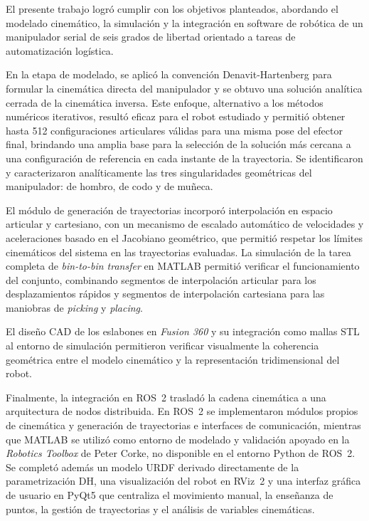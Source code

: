 \documentclass{article}
\begin{document}
El presente trabajo logró cumplir con los objetivos planteados, abordando el modelado cinemático, la simulación y la integración en software de robótica de un manipulador serial de seis grados de libertad orientado a tareas de automatización logística.

En la etapa de modelado, se aplicó la convención Denavit-Hartenberg para formular la cinemática directa del manipulador y se obtuvo una solución analítica cerrada de la cinemática inversa. Este enfoque, alternativo a los métodos numéricos iterativos, resultó eficaz para el robot estudiado y permitió obtener hasta 512 configuraciones articulares válidas para una misma pose del efector final, brindando una amplia base para la selección de la solución más cercana a una configuración de referencia en cada instante de la trayectoria. Se identificaron y caracterizaron analíticamente las tres singularidades geométricas del manipulador: de hombro, de codo y de muñeca.

El módulo de generación de trayectorias incorporó interpolación en espacio articular y cartesiano, con un mecanismo de escalado automático de velocidades y aceleraciones basado en el Jacobiano geométrico, que permitió respetar los límites cinemáticos del sistema en las trayectorias evaluadas. La simulación de la tarea completa de \textit{bin-to-bin transfer} en MATLAB permitió verificar el funcionamiento del conjunto, combinando segmentos de interpolación articular para los desplazamientos rápidos y segmentos de interpolación cartesiana para las maniobras de \textit{picking} y \textit{placing}.

El diseño CAD de los eslabones en \textit{Fusion 360} y su integración como mallas STL al entorno de simulación permitieron verificar visualmente la coherencia geométrica entre el modelo cinemático y la representación tridimensional del robot.

Finalmente, la integración en ROS~2 trasladó la cadena cinemática a una arquitectura de nodos distribuida. En ROS~2 se implementaron módulos propios de cinemática y generación de trayectorias e interfaces de comunicación, mientras que MATLAB se utilizó como entorno de modelado y validación apoyado en la \textit{Robotics Toolbox} de Peter Corke, no disponible en el entorno Python de ROS~2. Se completó además un modelo URDF derivado directamente de la parametrización DH, una visualización del robot en RViz~2 y una interfaz gráfica de usuario en PyQt5 que centraliza el movimiento manual, la enseñanza de puntos, la gestión de trayectorias y el análisis de variables cinemáticas.
\end{document}
